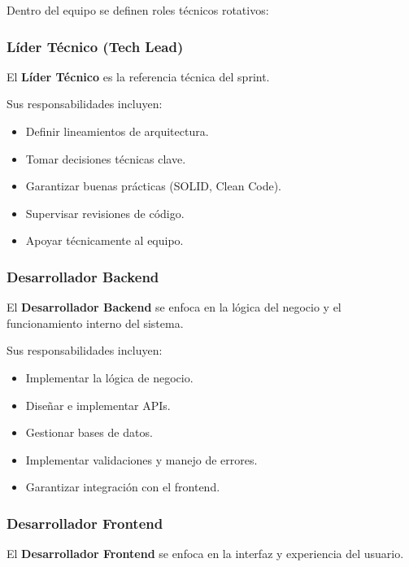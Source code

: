 \documentclass[12pt]{article}
\begin{document}
Dentro del equipo se definen roles técnicos rotativos:

\subsubsection{Líder Técnico (Tech Lead)}

El \textbf{Líder Técnico} es la referencia técnica del sprint.

Sus responsabilidades incluyen:

\begin{itemize}
    \item Definir lineamientos de arquitectura.
    \item Tomar decisiones técnicas clave.
    \item Garantizar buenas prácticas (SOLID, Clean Code).
    \item Supervisar revisiones de código.
    \item Apoyar técnicamente al equipo.
\end{itemize}

\subsubsection{Desarrollador Backend}

El \textbf{Desarrollador Backend} se enfoca en la lógica del negocio y el funcionamiento interno del sistema.

Sus responsabilidades incluyen:

\begin{itemize}
    \item Implementar la lógica de negocio.
    \item Diseñar e implementar APIs.
    \item Gestionar bases de datos.
    \item Implementar validaciones y manejo de errores.
    \item Garantizar integración con el frontend.
\end{itemize}

\subsubsection{Desarrollador Frontend}

El \textbf{Desarrollador Frontend} se enfoca en la interfaz y experiencia del usuario.
\end{document}
